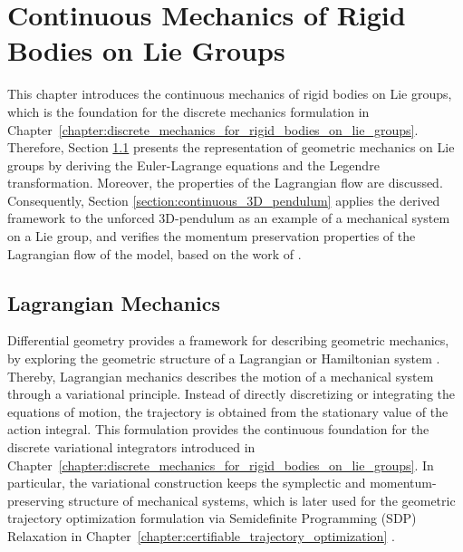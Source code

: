 \chapter{Continuous Mechanics of Rigid Bodies on Lie Groups}
\label{chapter:continous_mechanics_of_rigid_bodies_on_lie_groups}


This chapter introduces the continuous mechanics of rigid bodies on Lie groups, which is the foundation for the discrete mechanics formulation in Chapter~\ref{chapter:discrete_mechanics_for_rigid_bodies_on_lie_groups}. 
Therefore, Section \ref{sec:continuous_lagrangian_mechanics} presents the representation of geometric mechanics on Lie groups
by deriving the Euler-Lagrange equations and the Legendre transformation. Moreover, the properties of the Lagrangian flow are discussed. Consequently, 
Section \ref{section:continuous_3D_pendulum} applies the derived framework to the unforced 3D-pendulum as an example of a mechanical system on a Lie group, and verifies the momentum preservation properties of the Lagrangian 
flow of the model, based on the work of \cite{Lee2008}. 


\section{Lagrangian Mechanics}
\label{sec:continuous_lagrangian_mechanics}

Differential geometry provides a framework for describing geometric mechanics, by
exploring the geometric structure of a Lagrangian or Hamiltonian system \cite{Lee2008}.
Thereby, Lagrangian mechanics describes the motion of a mechanical system through
a variational principle. Instead of directly discretizing or integrating
the equations of motion, the trajectory is obtained from the stationary
value of the action integral. This formulation provides the continuous 
foundation for the discrete variational integrators introduced in 
Chapter~\ref{chapter:discrete_mechanics_for_rigid_bodies_on_lie_groups}. 
In particular, the variational construction keeps the symplectic and 
momentum-preserving structure of mechanical systems, which is later used 
for the geometric trajectory optimization formulation via Semidefinite Programming (SDP) Relaxation in Chapter~\ref{chapter:certifiable_trajectory_optimization}
\cite{Lee2008,Marsden2001,Sangli2025}.

